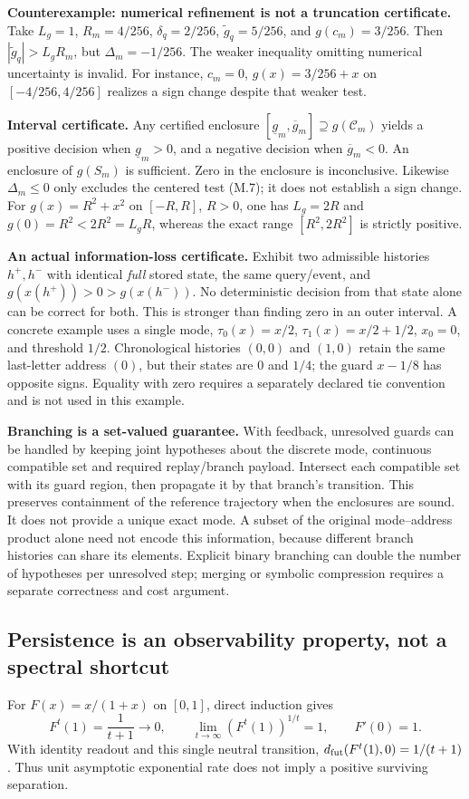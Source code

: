 \textbf{Counterexample: numerical refinement is not a truncation certificate.}
Take $L_g=1$, $R_m=4/256$, $\delta_q=2/256$,
$\widetilde g_q=5/256$, and $g(c_m)=3/256$.
Then $|\widetilde g_q|>L_gR_m$, but $\Delta_m=-1/256$.
The weaker inequality omitting numerical uncertainty is invalid.
For instance, $c_m=0$, $g(x)=3/256+x$ on
$[-4/256,4/256]$ realizes a sign change despite that weaker test.

\textbf{Interval certificate.} Any certified enclosure
$[\underline g_m,\overline g_m]\supseteq g(\mathcal C_m)$ yields a
positive decision when $\underline g_m>0$, and a negative decision when
$\overline g_m<0$. An enclosure of $g(S_m)$ is sufficient.
Zero in the enclosure is inconclusive. Likewise $\Delta_m\le0$ only
excludes the centered test (M.7); it does not establish a sign change.
For $g(x)=R^2+x^2$ on $[-R,R]$, $R>0$, one has $L_g=2R$ and
$g(0)=R^2<2R^2=L_gR$, whereas the exact range
$[R^2,2R^2]$ is strictly positive.

\textbf{An actual information-loss certificate.} Exhibit two admissible
histories $h^+,h^-$ with identical \emph{full} stored state, the same
query/event, and $g(x(h^+))>0>g(x(h^-))$. No deterministic decision from
that state alone can be correct for both. This is stronger than finding
zero in an outer interval. A concrete example uses a single mode,
$\tau_0(x)=x/2$, $\tau_1(x)=x/2+1/2$, $x_0=0$, and threshold $1/2$.
Chronological histories $(0,0)$ and $(1,0)$ retain the same last-letter
address $(0)$, but their states are $0$ and $1/4$; the guard $x-1/8$
has opposite signs. Equality with zero requires a separately declared
tie convention and is not used in this example.

\textbf{Branching is a set-valued guarantee.} With feedback, unresolved
guards can be handled by keeping joint hypotheses about the discrete mode,
continuous compatible set and required replay/branch payload. Intersect each
compatible set with its guard region, then propagate it by that branch's
transition. This preserves containment of the reference trajectory when the
enclosures are sound. It does not provide a unique exact mode. A subset of
the original mode--address product alone need not encode this information,
because different branch histories can share its elements. Explicit binary
branching can double the number of hypotheses per unresolved step; merging
or symbolic compression requires a separate correctness and cost argument.

\subsection{Persistence is an observability property, not a spectral shortcut}
For $F(x)=x/(1+x)$ on $[0,1]$, direct induction gives
\[
 F^t(1)=\frac1{t+1}\longrightarrow0,\qquad
 \lim_{t\to\infty}(F^t(1))^{1/t}=1,\qquad F'(0)=1.
\]
With identity readout and this single neutral transition,
$d_{\rm fut}(F^t(1),0)=1/(t+1)$. Thus unit asymptotic exponential rate
does not imply a positive surviving separation.

